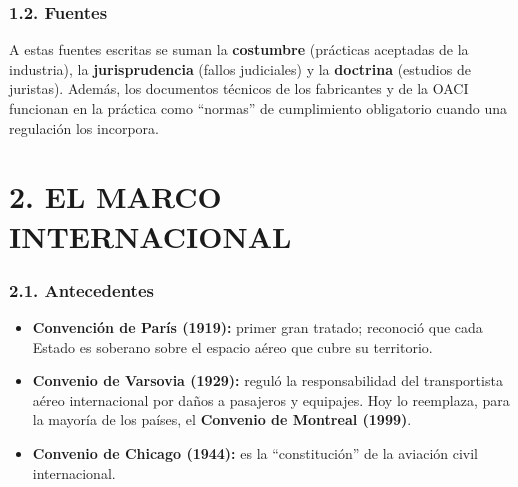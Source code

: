 \subsubsection*{1.2. Fuentes}
\begin{center}
\end{center}
A estas fuentes escritas se suman la \textbf{costumbre} (prácticas aceptadas de la industria),
la \textbf{jurisprudencia} (fallos judiciales) y la \textbf{doctrina} (estudios de juristas).
Además, los documentos técnicos de los fabricantes y de la OACI funcionan en la práctica como
``normas'' de cumplimiento obligatorio cuando una regulación los incorpora.

\section*{2. EL MARCO INTERNACIONAL}

\subsubsection*{2.1. Antecedentes}
\begin{itemize}
  \item \textbf{Convención de París (1919):} primer gran tratado; reconoció que cada Estado es
        soberano sobre el espacio aéreo que cubre su territorio.
  \item \textbf{Convenio de Varsovia (1929):} reguló la responsabilidad del transportista aéreo
        internacional por daños a pasajeros y equipajes. Hoy lo reemplaza, para la mayoría de
        los países, el \textbf{Convenio de Montreal (1999)}.
  \item \textbf{Convenio de Chicago (1944):} es la ``constitución'' de la aviación civil
        internacional.
\end{itemize}

